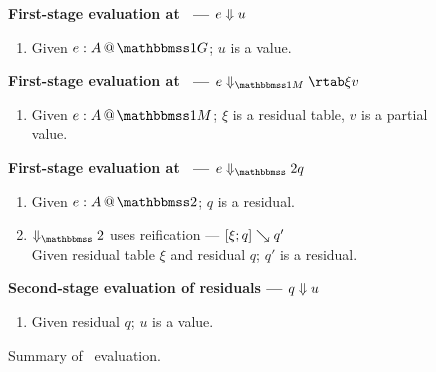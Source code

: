 
\begin{figure}
\begin{abstrsyn}

\textbf{First-stage evaluation at \bbonep\ ---
${e} \Downarrow {u}$}
\begin{enumerate}
\item[] Given $\colpure e A$;
$u$ is a value.
\end{enumerate}

\textbf{First-stage evaluation at \bbonem\ ---
$\diaone e \xi v$}
\begin{enumerate}
\item[] Given $\colmix e A$;
$\xi$ is a residual table, 
$v$ is a partial value.
\end{enumerate}

\textbf{First-stage evaluation at \bbtwo\ ---
$\diatwo e q$}
\begin{enumerate}
\item[] Given $\coltwo e A$;
$q$ is a residual.
\item[] $\redtwosym$ uses reification --- $[{\xi};{q}]\searrow{q}'$ \\
Given residual table $\xi$ and residual $q$; $q'$ is a residual.
\end{enumerate}

\textbf{Second-stage evaluation of residuals ---
${q} \Downarrow {u}$}
\begin{enumerate}
\item[] Given residual $q$;
$u$ is a value.
\end{enumerate}

\end{abstrsyn}
\caption{Summary of \lang\ evaluation.}
\label{fig:dynamicsSummary}
\end{figure}

